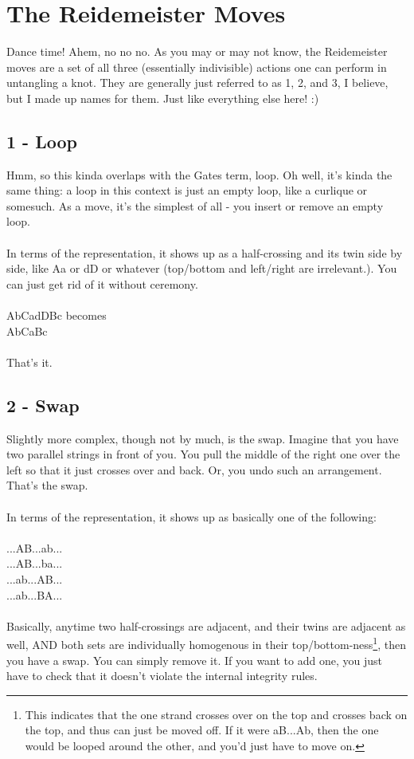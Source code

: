 \documentclass[twoside]{report}
\begin{document}
\section{The Reidemeister Moves}
Dance time!  Ahem, no no no.  As you may or may not know, the Reidemeister moves are a set of all three (essentially indivisible) actions one can perform in untangling a knot.  They are generally just referred to as 1, 2, and 3, I believe, but I made up names for them.  Just like everything else here! :)

\subsection{1 - Loop}
Hmm, so this kinda overlaps with the Gates term, loop.  Oh well, it's kinda the same thing: a loop in this context is just an empty loop, like a curlique or somesuch.  As a move, it's the simplest of all - you insert or remove an empty loop.\\\\

In terms of the representation, it shows up as a half-crossing and its twin side by side, like Aa or dD or whatever (top/bottom and left/right are irrelevant.).  You can just get rid of it without ceremony.\\\\
AbCadDBc becomes\\
AbCaBc\\\\
That's it.

\subsection{2 - Swap}
Slightly more complex, though not by much, is the swap.  Imagine that you have two parallel strings in front of you.  You pull the middle of the right one over the left so that it just crosses over and back.  Or, you undo such an arrangement.  That's the swap.\\\\
In terms of the representation, it shows up as basically one of the following:\\\\
...AB...ab...\\
...AB...ba...\\
...ab...AB...\\
...ab...BA...\\\\

Basically, anytime two half-crossings are adjacent, and their twins are adjacent as well, AND both sets are individually homogenous in their top/bottom-ness\footnote{This indicates that the one strand crosses over on the top and crosses back on the top, and thus can just be moved off.  If it were aB...Ab, then the one would be looped around the other, and you'd just have to move on.}, then you have a swap.  You can simply remove it.  If you want to add one, you just have to check that it doesn't violate the internal integrity rules.
\end{document}
